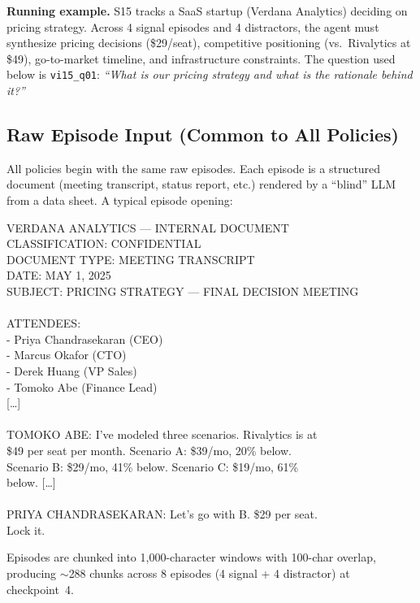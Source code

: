 \documentclass[11pt,a4paper]{article}
\begin{document}
\textbf{Running example.} S15 tracks a SaaS startup (Verdana Analytics) deciding on pricing strategy. Across 4 signal episodes and 4 distractors, the agent must synthesize pricing decisions (\$29/seat), competitive positioning (vs.\ Rivalytics at \$49), go-to-market timeline, and infrastructure constraints. The question used below is \texttt{vi15\_q01}: \emph{``What is our pricing strategy and what is the rationale behind it?''}

\subsection{Raw Episode Input (Common to All Policies)}

All policies begin with the same raw episodes. Each episode is a structured document (meeting transcript, status report, etc.) rendered by a ``blind'' LLM from a data sheet. A typical episode opening:

\begin{tracebox}[title=Episode signal\_001 (excerpt --- 31{,}166 chars total)]
\small\ttfamily
VERDANA ANALYTICS --- INTERNAL DOCUMENT\\
CLASSIFICATION: CONFIDENTIAL\\
DOCUMENT TYPE: MEETING TRANSCRIPT\\
DATE: MAY 1, 2025\\
SUBJECT: PRICING STRATEGY --- FINAL DECISION MEETING\\
\\
ATTENDEES:\\
- Priya Chandrasekaran (CEO)\\
- Marcus Okafor (CTO)\\
- Derek Huang (VP Sales)\\
- Tomoko Abe (Finance Lead)\\
\textrm{[\ldots]}\\
\\
TOMOKO ABE: I've modeled three scenarios. Rivalytics is at\\
\$49 per seat per month. Scenario A: \$39/mo, 20\% below.\\
Scenario B: \$29/mo, 41\% below. Scenario C: \$19/mo, 61\%\\
below. [\ldots]\\
\\
PRIYA CHANDRASEKARAN: Let's go with B. \$29 per seat.\\
Lock it.
\end{tracebox}

Episodes are chunked into 1{,}000-character windows with 100-char overlap, producing ${\sim}$288 chunks across 8 episodes (4 signal + 4 distractor) at checkpoint~4.
\end{document}

